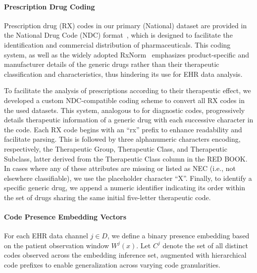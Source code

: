 \paragraph*{Prescription Drug Coding}
 
Prescription drug (RX) codes in our primary (National) dataset are provided in the National Drug Code (NDC) format~\cite{FDA_NDC}, which is designed to facilitate the identification and commercial distribution of pharmaceuticals. This coding system, as well as the widely adopted RxNorm~\cite{NLM_RxNorm} emphasizes product-specific and manufacturer details of the generic drugs rather than their therapeutic classification and characteristics, thus hindering its use for EHR data analysis.


  

To facilitate the analysis of prescriptions according to their therapeutic effect, we developed a custom NDC-compatible coding scheme to convert all RX codes in the used datasets. This system, analogous to \ICD for diagnostic codes, progressively details therapeutic information of a generic drug with each successive character in the code. Each RX code begins with an ``rx'' prefix to enhance readability and facilitate parsing. This is followed by three alphanumeric characters encoding, respectively, the Therapeutic Group, Therapeutic Class, and Therapeutic Subclass, latter derived from the Therapeutic Class column in the RED BOOK. In cases where any of these attributes are missing or listed as NEC (i.e., not elsewhere classifiable), we use the placeholder character ``X''. Finally, to identify a specific generic drug, we append a numeric identifier indicating its order within the set of drugs sharing the same initial five-letter therapeutic code.%

\paragraph*{Code Presence Embedding Vectors}
For each EHR data channel $j \in D$, we define a binary presence embedding based on the patient observation window $W^j(x)$. Let $C^j$ denote the set of all distinct codes observed across the embedding inference set, augmented with hierarchical code prefixes to enable generalization across varying code granularities.

